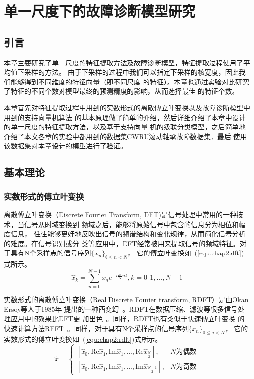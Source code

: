 \chapter{单一尺度下的故障诊断模型研究}
\label{cha:chapter2}

\section{引言}

本章主要研究了单一尺度的特征提取方法及故障诊断模型，特征提取过程使用了平均值下采样的方法。
由于下采样的过程中我们可以指定下采样的核宽度，因此我们能够得到不同维度的特征向量（即不同尺度
的特征）。本章也通过实验对比研究了特征的不同个数对模型最终的预测精度的影响，从而选择最佳
的特征个数。

本章首先对特征提取过程中用到的实数形式的离散傅立叶变换以及故障诊断模型中用到的支持向量机算法
的基本原理做了简单的介绍，然后详细介绍了本章中设计的单一尺度的特征提取方法，以及基于支持向量
机的级联分类模型，之后简单地介绍了本文各章的实验中都用到的数据集CWRU滚动轴承故障数据集，最后
使用该数据集对本章设计的模型进行了验证。

\section{基本理论}

\subsection{实数形式的傅立叶变换}
\label{subsection:rdft}

离散傅立叶变换（Discrete Fourier Transform, DFT)是信号处理中常用的一种技术，当信号从时域变换到
频域之后，能够将原始信号中包含的信息分为相位和幅度信息，
往往能够更好地反映出信号的频谱结构和变化规律，从而简化信号分析的难度。在信号识别或分
类等应用中，DFT经常被用来提取信号的频域特征。对于具有N个采样点的信号序列$\{x_n\}_{0\leq n < N}$，
它的傅立叶变换如~(\ref{equ:chap2:dft})式所示。
\begin{equation}
\label{equ:chap2:dft}
  \hat{x}_k=\sum_{n=0}^{N-1}x_n e^{-i\frac{2\pi}{N}nk}, k=0,1,...,N-1
\end{equation}

实数形式的离散傅立叶变换（Real Discrete Fourier transform, RDFT）是由Okan Ersoy等人于1985年
提出的一种酉变幻~\cite{ersoy1985real}。RDFT在数据压缩、滤波等很多信号处理应用中的效果比DFT更
加出色~\cite{ersoy1988fast}。同样，RDFT也有类似于快速傅立叶变换
的快速计算方法RFFT~\cite{ersoy1988fast}。同样，对于具有N个采样点的信号序列$\{x_n\}_{0\leq n < N}$，
它的实数形式的傅立叶变换如~(\ref{equ:chap2:rdft})式所示。
\begin{equation}
\label{equ:chap2:rdft}
  \widetilde{x}=
  \begin{cases}
    \left[\hat{x}_0, \text{Re}\hat{x}_1, \text{Im}\hat{x}_1, ..., \text{Re}\hat{x}_{\frac{N}{2}}\right],  & N\text{为偶数}\\
    \left[\hat{x}_0, \text{Re}\hat{x}_1, \text{Im}\hat{x}_1, ..., \text{Im}\hat{x}_{\frac{N-1}{2}}\right],& N\text{为奇数}
  \end{cases}
\end{equation}

